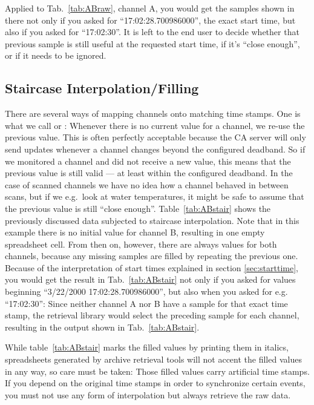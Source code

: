 Applied to Tab.~\ref{tab:ABraw}, channel A, you would get the samples
shown in there not only if you asked for ``17:02:28.700986000'', the
exact start time, but also if you asked for ``17:02:30''.
It is left to the end user to decide whether that previous sample is
still useful at the requested start time, if it's ``close enough'', or
if it needs to be ignored.

\subsection{Staircase Interpolation/Filling} \label{sec:filling}
There are several ways of mapping channels onto matching time
stamps. One is what we call  or
: Whenever there is no current value for a channel, we
re-use the previous value. This is often perfectly acceptable because
the CA server will only send updates whenever a channel changes beyond
the configured deadband. So if we monitored a channel and did not
receive a new value, this means that the previous value is still valid
--- at least within the configured deadband. In the case of scanned
channels we have no idea how a channel behaved in between scans, but
if we e.g.\ look at water temperatures, it might be safe to assume
that the previous value is still ``close enough''.
Table~\ref{tab:ABstair} shows the previously discussed data subjected
to staircase interpolation. Note that in this example there is no
initial value for channel B, resulting in one empty spreadsheet
cell. From then on, however, there are always values for both
channels, because any missing samples are filled by repeating the
previous one.  Because of the interpretation of start times explained
in section \ref{sec:starttime}, you would get the result in
 Tab.\ \ref{tab:ABstair} not only if you asked for values beginning
``3/22/2000 17:02:28.700986000'', but also when you asked for
e.g. ``17:02:30'': Since neither channel A nor B have a sample for that
exact time stamp, the retrieval library would select the
preceding sample for each channel, resulting in the output shown in 
Tab.\ \ref{tab:ABstair}.

\NOTE While table~\ref{tab:ABstair} marks the filled values by
printing them in italics, spreadsheets generated by archive retrieval
tools will not accent the filled values in any way, so care must be
taken: Those filled values carry artificial time stamps. If you depend
on the original time stamps in order to synchronize certain events,
you must not use any form of interpolation but always retrieve the raw
data. 

